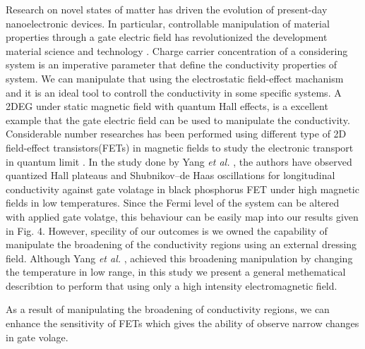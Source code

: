 \documentclass{article}
\begin{document}
{Research on novel states of matter has driven the evolution of present-day nanoelectronic devices. In particular, controllable manipulation of material properties through a gate electric field has revolutionized the development  material science and technology \cite{ahn03,deng18}.
Charge carrier concentration of a considering system is an imperative parameter that define the conductivity properties of system. We can manipulate that using the electrostatic field-effect machanism and it is an ideal tool to controll the conductivity in some specific systems.
A 2DEG under static magnetic field with quantum Hall effects, is a excellent example that the gate electric field can be used to manipulate the conductivity. Considerable number researches has been performed using different type of 2D field-effect transistors(FETs) in magnetic fields to study the electronic transport in quantum limit \cite{wakabayashi78,yang18,long20,li14}. In the study done by Yang \textit{et al.} \cite{yang18}, the authors have observed quantized Hall plateaus and Shubnikov–de Haas oscillations for longitudinal conductivity against gate volatage in black phosphorus FET under high magnetic fields in low temperatures. Since the Fermi level of the system can be altered with applied gate volatge, this behaviour can be easily map into our results given in Fig. 4. However, specility of our outcomes is we owned the capability of manipulate the broadening of the conductivity regions using an external dressing field. Although Yang \textit{et al.} \cite{yang18}, achieved this broadening manipulation by changing the temperature in low range, in this study we present a general methematical describtion to perform that using only a high intensity electromagnetic field.

As a result of manipulating the broadening of conductivity regions, we can enhance the sensitivity of FETs which gives the ability of observe narrow changes in gate volage.

























}
\end{document}
